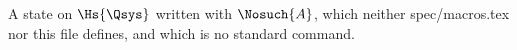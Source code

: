 \begin{definition}\label{def:base}
  A state on $\Hs{\Qsys}$ written with $\Nosuch{A}$, which neither
  spec/macros.tex nor this file defines, and which is no standard command.
\end{definition}
